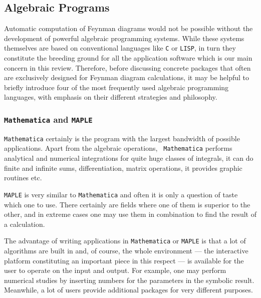 \subsection{\label{secalgprg}Algebraic Programs}
%
Automatic computation of Feynman diagrams would not be possible without
the development of powerful algebraic programming systems. While these
systems themselves are based on conventional languages like {\tt C} or
{\tt LISP}, in turn they constitute the breeding ground for all the
application software which is our main concern in this review.
Therefore, before discussing concrete packages that often are
exclusively designed for Feynman diagram calculations, it may be helpful
to briefly introduce four of the most frequently used algebraic
programming languages, with emphasis on their different strategies and
philosophy.

\subsubsection{{\tt Mathematica} and {\tt MAPLE}}
%
{\tt Mathematica} certainly is the program with the largest bandwidth of
possible applications. Apart from the algebraic operations, {\tt
  Mathematica} performs analytical and numerical integrations for quite
huge classes of integrals, it can do finite and infinite sums,
differentiation, matrix operations, it provides graphic routines etc.

{\tt MAPLE} is very similar to {\tt Mathematica} and often it is only a
question of taste which one to use. There certainly are fields where one
of them is superior to the other, and in extreme cases one may use them
in combination to find the result of a calculation.

The advantage of writing applications in {\tt Mathematica}
or {\tt MAPLE} is that a lot of algorithms are built in and, of course,
the whole environment --- the interactive platform constituting an
important piece in this respect --- is available for the user to operate
on the input and output. For example, one may perform numerical studies
by inserting numbers for the parameters in the symbolic result.
Meanwhile, a lot of users provide additional packages for
very different purposes.

